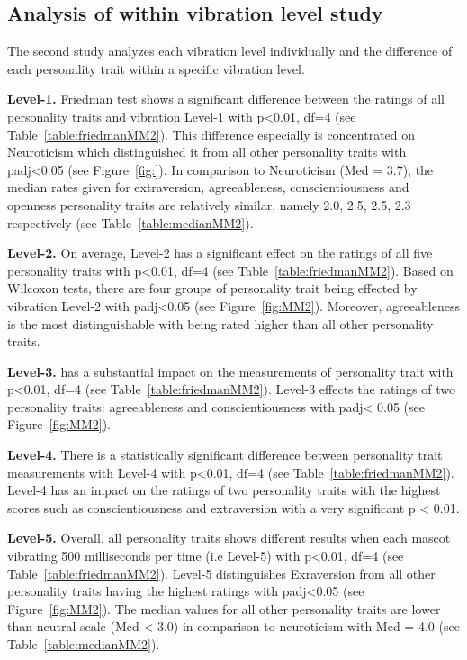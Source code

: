 \subsection{Analysis of within vibration level study}
\label{subsec:MMstudy2}
The second study analyzes each vibration level individually and the difference
of each personality trait within a specific vibration level.

\par\textbf{Level-1.}
Friedman test shows a significant difference between the ratings of all personality traits
and vibration Level-1 with p<0.01, df=4 (see Table~\ref{table:friedmanMM2}).
This difference especially is concentrated on Neuroticism which distinguished it from all
other personality traits with padj<0.05 (see Figure~\ref{fig:}).
In comparison to Neuroticism (Med = 3.7), the median rates given for extraversion,
agreeableness, conscientiousness and openness personality traits are relatively similar,
namely 2.0, 2.5, 2.5, 2.3 respectively (see Table~\ref{table:medianMM2}).

\par\textbf{Level-2.}
On average, Level-2 has a significant effect on the ratings of all five personality
traits with p<0.01, df=4 (see Table~\ref{table:friedmanMM2}).
Based on Wilcoxon tests, there are four groups of personality trait being effected by
vibration Level-2 with padj<0.05 (see Figure~\ref{fig:MM2}).
Moreover, agreeableness is the most distinguishable with being rated higher
than all other personality traits.

\par\textbf{Level-3.}
has a substantial impact on the measurements of personality trait
with p<0.01, df=4 (see Table~\ref{table:friedmanMM2}).
Level-3 effects the ratings of two personality traits: agreeableness and
conscientiousness with padj< 0.05 (see Figure~\ref{fig:MM2}).

\par\textbf{Level-4.}
There is a statistically significant difference between personality trait measurements
with Level-4 with p<0.01, df=4 (see Table~\ref{table:friedmanMM2}).
Level-4 has an impact on the ratings of  two personality traits with the highest scores
such as conscientiousness and extraversion
with a very significant p < 0.01.

\par\textbf{Level-5.}
Overall, all personality traits shows different results when each mascot vibrating 500 milliseconds
per time (i.e Level-5) with p<0.01, df=4 (see Table~\ref{table:friedmanMM2}).
Level-5 distinguishes Exraversion from all other personality traits having the
highest ratings with padj<0.05 (see Figure~\ref{fig:MM2}).
The median values for all other personality traits are lower than neutral scale (Med < 3.0)
in comparison to neuroticism with Med = 4.0 (see Table~\ref{table:medianMM2}).

